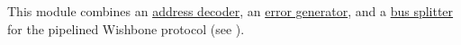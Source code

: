 This module combines an \hyperref[adec]{address decoder}, an \hyperref[errgen]{error generator},
and a \hyperref[split]{bus splitter} for the pipelined Wishbone protocol (see ). 

